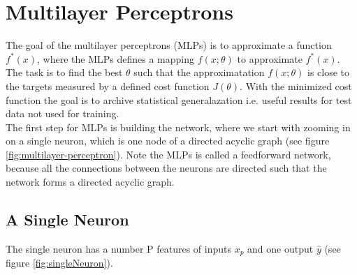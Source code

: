 
\section{Multilayer Perceptrons}\label{multilayerPerceptron}
The goal of the multilayer perceptrons (MLPs) is to approximate a function $f^*(x)$, where the MLPs defines a mapping $f(x;\theta)$ to approximate $f^*(x)$. The task is to find the best $\theta$ such that the approximatation $f(x;\theta)$ is close to the targets measured by a defined cost function $J(\theta)$. With the minimized cost function the goal is to archive statistical generalazation i.e. useful results for test data not used for training. \\

The first step for MLPs is building the network, where we start with zooming in on a single neuron, which is one node of a directed acyclic graph (see figure \ref{fig:multilayer-perceptron}). Note the MLPs is called a feedforward network, because all the connections between the neurons are directed such that the network forms a directed acyclic graph.

\subsection{A Single Neuron}\label{singleNeuron}
The single neuron has a number P features of inputs $x_p$ and one output $\hat{y}$ (see figure \ref{fig:singleNeuron}). 

